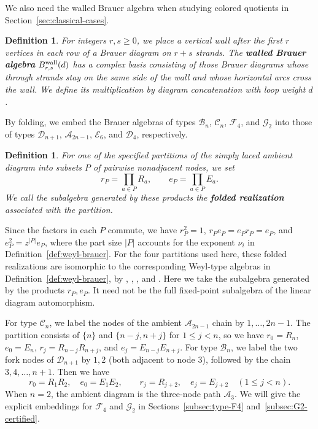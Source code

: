 \documentclass[11pt,a4paper]{amsart}
\theoremstyle{uprightdefinition}
\newtheorem{definition}[theorem]{Definition}
\theoremstyle{remark}\newtheorem{remark}[theorem]{Remark}
\begin{document}
We also need the walled Brauer algebra when studying colored quotients in Section~\ref{sec:classical-cases}.
\begin{definition}\label{def:walled-brauer}
\cite[page~171, Section~2]{CDDM2008}
For integers $r,s\ge0$, we place a vertical wall after the first $r$ vertices in each row
of a Brauer diagram on $r+s$ strands. The \textbf{walled Brauer algebra}
$B^{\rm wall}_{r,s}(d)$ has a complex basis consisting of those Brauer diagrams whose
through strands stay on the same side of the wall and whose horizontal
arcs cross the wall. We define its multiplication by diagram concatenation with loop weight $d$.
\end{definition}

By folding, we embed the Brauer algebras of types $\mathscr{B}_n$, $\mathscr{C}_n$, $\mathscr{F}_4$, and $\mathscr{G}_2$ into those of types $\mathscr{D}_{n+1}$,
$\mathscr{A}_{2n-1}$, $\mathscr{E}_6$, and $\mathscr{D}_4$, respectively.

\begin{definition}\label{def:folded-realization}
For one of the specified partitions of the simply laced ambient diagram
into subsets $P$ of pairwise nonadjacent nodes, we set
\[
 r_P=\prod_{a\in P}R_a,\qquad e_P=\prod_{a\in P}E_a.
\]
We call the subalgebra generated by these products the \textbf{folded realization}
associated with the partition.
\end{definition}

Since the factors in each $P$ commute, we have $r_P^2=1$, $r_Pe_P=e_Pr_P=e_P$, and
$e_P^2=z^{|P|}e_P$, where the part size $|P|$ accounts for the exponent $\nu_i$ in Definition~\ref{def:weyl-brauer}.
For the four partitions used here, these folded realizations are isomorphic
to the corresponding Weyl-type algebras in Definition~\ref{def:weyl-brauer}, by
\cite[Theorem~2.6]{CohenLiu2014}, \cite[Theorem~1.1]{CLY2012},
\cite[Theorem~1.2]{LiuF42013}, and \cite[Theorem~6.1]{LiuG22015}.
Here we take the subalgebra generated by the products $r_P,e_P$.
It need not be the full fixed-point subalgebra of the linear diagram automorphism.

For type $\mathscr{C}_n$, we label the nodes of the ambient $\mathscr{A}_{2n-1}$ chain by $1,\ldots,2n-1$.
The partition consists of $\{n\}$ and $\{n-j,n+j\}$ for $1\le j<n$, so we have
$r_0=R_n$, $e_0=E_n$, $r_j=R_{n-j}R_{n+j}$, and
$e_j=E_{n-j}E_{n+j}$. For type $\mathscr{B}_n$, we label the two fork nodes of
$\mathscr{D}_{n+1}$ by $1,2$ (both adjacent to node $3$), followed by the chain
$3,4,\ldots,n+1$. Then we have
\[
 r_0=R_1R_2,\quad e_0=E_1E_2,\qquad
 r_j=R_{j+2},\quad e_j=E_{j+2}\quad(1\le j<n).
\]
When $n=2$, the ambient diagram is the three-node path $\mathscr{A}_3$. We will give the explicit embeddings for $\mathscr{F}_4$ and $\mathscr{G}_2$ in
Sections~\ref{subsec:type-F4} and~\ref{subsec:G2-certified}.
\end{document}
